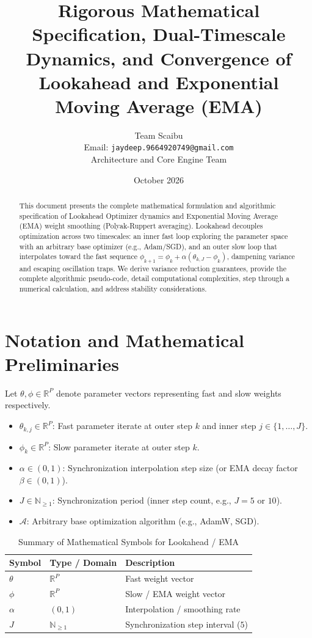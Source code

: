 \documentclass[11pt,a4paper]{article}
\title{\textbf{Rigorous Mathematical Specification, Dual-Timescale Dynamics, and Convergence of Lookahead and Exponential Moving Average (EMA)}}
\author{Team Scaibu \\ \small Email: \texttt{jaydeep.9664920749@gmail.com} \\ \small Architecture and Core Engine Team}
\date{October 2026}
\theoremstyle{definition}
\begin{document}
\maketitle

\begin{abstract}
This document presents the complete mathematical formulation and algorithmic specification of Lookahead Optimizer dynamics and Exponential Moving Average (EMA) weight smoothing (Polyak-Ruppert averaging). Lookahead decouples optimization across two timescales: an inner fast loop exploring the parameter space with an arbitrary base optimizer (e.g., Adam/SGD), and an outer slow loop that interpolates toward the fast sequence $\phi_{k+1} = \phi_k + \alpha (\theta_{k, J} - \phi_k)$, dampening variance and escaping oscillation traps. We derive variance reduction guarantees, provide the complete algorithmic pseudo-code, detail computational complexities, step through a numerical calculation, and address stability considerations.
\end{abstract}

\section{Notation and Mathematical Preliminaries}

Let $\theta, \phi \in \mathbb{R}^P$ denote parameter vectors representing fast and slow weights respectively.

\begin{itemize}
    \item $\theta_{k, j} \in \mathbb{R}^P$: Fast parameter iterate at outer step $k$ and inner step $j \in \{1, \dots, J\}$.
    \item $\phi_k \in \mathbb{R}^P$: Slow parameter iterate at outer step $k$.
    \item $\alpha \in (0, 1)$: Synchronization interpolation step size (or EMA decay factor $\beta \in (0, 1)$).
    \item $J \in \mathbb{N}_{\ge 1}$: Synchronization period (inner step count, e.g., $J = 5$ or $10$).
    \item $\mathcal{A}$: Arbitrary base optimization algorithm (e.g., AdamW, SGD).
\end{itemize}

\begin{table}[h]
\centering
\caption{Summary of Mathematical Symbols for Lookahead / EMA}
\begin{tabular}{lll}
\toprule
\textbf{Symbol} & \textbf{Type / Domain} & \textbf{Description} \\
\midrule
$\theta$ & $\mathbb{R}^P$ & Fast weight vector \\
$\phi$ & $\mathbb{R}^P$ & Slow / EMA weight vector \\
$\alpha$ & $(0, 1)$ & Interpolation / smoothing rate \\
$J$ & $\mathbb{N}_{\ge 1}$ & Synchronization step interval ($5$) \\
\bottomrule
\end{tabular}
\end{table}
\end{document}
